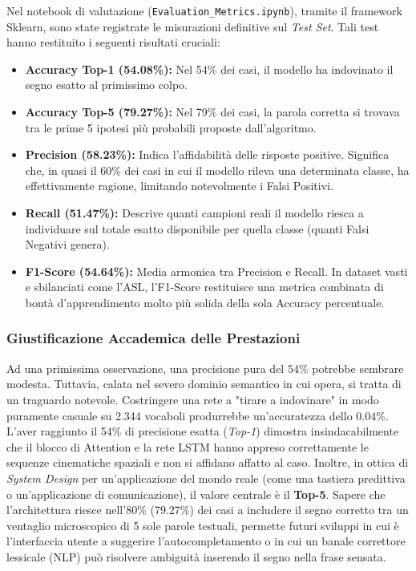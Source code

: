 Nel notebook di valutazione (\texttt{Evaluation\_Metrics.ipynb}), tramite il framework Sklearn, sono state registrate le misurazioni definitive sul \textit{Test Set}. Tali test hanno restituito i seguenti risultati cruciali:

\begin{itemize}
    \item \textbf{Accuracy Top-1 (54.08\%):} Nel 54\% dei casi, il modello ha indovinato il segno esatto al primissimo colpo.
    \item \textbf{Accuracy Top-5 (79.27\%):} Nel 79\% dei casi, la parola corretta si trovava tra le prime 5 ipotesi più probabili proposte dall'algoritmo.
    \item \textbf{Precision (58.23\%):} Indica l'affidabilità delle risposte positive. Significa che, in quasi il 60\% dei casi in cui il modello rileva una determinata classe, ha effettivamente ragione, limitando notevolmente i Falsi Positivi.
    \item \textbf{Recall (51.47\%):} Descrive quanti campioni reali il modello riesca a individuare sul totale esatto disponibile per quella classe (quanti Falsi Negativi genera).
    \item \textbf{F1-Score (54.64\%):} Media armonica tra Precision e Recall. In dataset vasti e sbilanciati come l'ASL, l'F1-Score restituisce una metrica combinata di bontà d'apprendimento molto più solida della sola Accuracy percentuale.
\end{itemize}

\subsubsection{Giustificazione Accademica delle Prestazioni}
Ad una primissima osservazione, una precisione pura del 54\% potrebbe sembrare modesta. Tuttavia, calata nel severo dominio semantico in cui opera, si tratta di un traguardo notevole. 
Costringere una rete a "tirare a indovinare" in modo puramente casuale su 2.344 vocaboli produrrebbe un'accuratezza dello $0.04\%$. L'aver raggiunto il 54\% di precisione esatta (\textit{Top-1}) dimostra insindacabilmente che il blocco di Attention e la rete LSTM hanno appreso correttamente le sequenze cinematiche spaziali e non si affidano affatto al caso.
Inoltre, in ottica di \textit{System Design} per un'applicazione del mondo reale (come una tastiera predittiva o un'applicazione di comunicazione), il valore centrale è il \textbf{Top-5}. Sapere che l'architettura riesce nell'80\% (79.27\%) dei casi a includere il segno corretto tra un ventaglio microscopico di 5 sole parole testuali, permette futuri sviluppi in cui è l'interfaccia utente a suggerire l'autocompletamento o in cui un banale correttore lessicale (NLP) può risolvere ambiguità inserendo il segno nella frase sensata.

